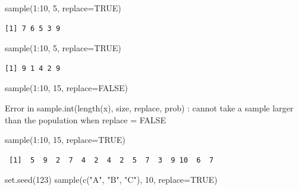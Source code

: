 \documentclass[
  letterpaper,
  DIV=11,
  numbers=noendperiod]{scrreprt}
\newenvironment{Shaded}{\begin{snugshade}}{\end{snugshade}}
\newcommand{\AttributeTok}[1]{\textcolor[rgb]{0.40,0.45,0.13}{#1}}
\newcommand{\ConstantTok}[1]{\textcolor[rgb]{0.56,0.35,0.01}{#1}}
\newcommand{\DecValTok}[1]{\textcolor[rgb]{0.68,0.00,0.00}{#1}}
\newcommand{\FunctionTok}[1]{\textcolor[rgb]{0.28,0.35,0.67}{#1}}
\newcommand{\NormalTok}[1]{\textcolor[rgb]{0.00,0.23,0.31}{#1}}
\newcommand{\SpecialCharTok}[1]{\textcolor[rgb]{0.37,0.37,0.37}{#1}}
\newcommand{\StringTok}[1]{\textcolor[rgb]{0.13,0.47,0.30}{#1}}
\begin{document}
\begin{Shaded}
\begin{Highlighting}[]
\FunctionTok{sample}\NormalTok{(}\DecValTok{1}\SpecialCharTok{:}\DecValTok{10}\NormalTok{, }\DecValTok{5}\NormalTok{, }\AttributeTok{replace=}\ConstantTok{TRUE}\NormalTok{)}
\end{Highlighting}
\end{Shaded}

\begin{verbatim}
[1] 7 6 5 3 9
\end{verbatim}

\begin{Shaded}
\begin{Highlighting}[]
\FunctionTok{sample}\NormalTok{(}\DecValTok{1}\SpecialCharTok{:}\DecValTok{10}\NormalTok{, }\DecValTok{5}\NormalTok{, }\AttributeTok{replace=}\ConstantTok{TRUE}\NormalTok{)}
\end{Highlighting}
\end{Shaded}

\begin{verbatim}
[1] 9 1 4 2 9
\end{verbatim}

\begin{Shaded}
\begin{Highlighting}[]
\FunctionTok{sample}\NormalTok{(}\DecValTok{1}\SpecialCharTok{:}\DecValTok{10}\NormalTok{, }\DecValTok{15}\NormalTok{, }\AttributeTok{replace=}\ConstantTok{FALSE}\NormalTok{)}
\end{Highlighting}
\end{Shaded}

{Error in sample.int(length(x), size, replace, prob) : cannot take a
sample larger than the population when \textquotesingle replace =
FALSE\textquotesingle{}}

\begin{Shaded}
\begin{Highlighting}[]
\FunctionTok{sample}\NormalTok{(}\DecValTok{1}\SpecialCharTok{:}\DecValTok{10}\NormalTok{, }\DecValTok{15}\NormalTok{, }\AttributeTok{replace=}\ConstantTok{TRUE}\NormalTok{)}
\end{Highlighting}
\end{Shaded}

\begin{verbatim}
 [1]  5  9  2  7  4  2  4  2  5  7  3  9 10  6  7
\end{verbatim}

\begin{Shaded}
\begin{Highlighting}[]
\FunctionTok{set.seed}\NormalTok{(}\DecValTok{123}\NormalTok{)}
\FunctionTok{sample}\NormalTok{(}\FunctionTok{c}\NormalTok{(}\StringTok{"A"}\NormalTok{, }\StringTok{"B"}\NormalTok{, }\StringTok{"C"}\NormalTok{), }\DecValTok{10}\NormalTok{, }\AttributeTok{replace=}\ConstantTok{TRUE}\NormalTok{)}
\end{Highlighting}
\end{Shaded}
\end{document}
